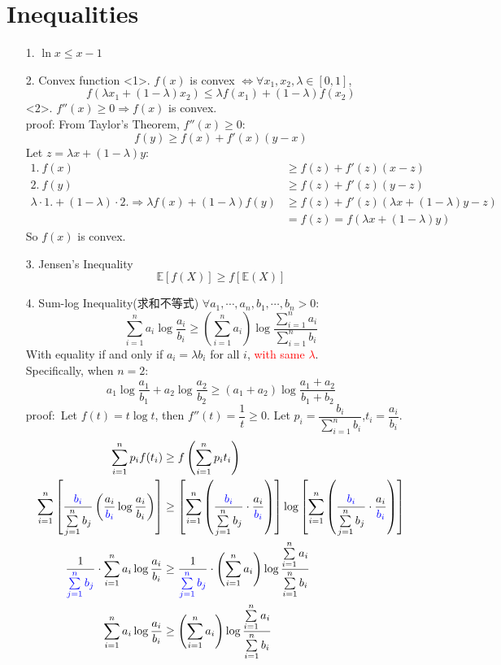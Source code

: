 
\section{Inequalities}
\begin{itemize}
\item[1.] $\ln x\leq x-1$
\item[2.] Convex function
<1>. $f(x)$ is convex $\Leftrightarrow \forall x_1,x_2,\lambda\in[0,1]$, $$f\left(\lambda x_1+(1-\lambda)x_2\right)\leq\lambda f(x_1)+(1-\lambda)f(x_2)$$
<2>. $f''(x)\geq 0\Rightarrow f(x)$ is convex.\\
proof: From Taylor's Theorem, $f''(x)\geq 0$:
$$f(y) \geq f(x) + f'(x)(y-x)$$
Let $z = \lambda x + (1-\lambda)y$:
\begin{align*}
1.\ f(x) &\geq f(z) + f'(z)(x-z) \\
2.\ f(y) &\geq f(z) + f'(z)(y-z) \\
\lambda\cdot 1. + (1-\lambda)\cdot 2. \Rightarrow \lambda f(x) + (1-\lambda)f(y) &\geq f(z) + f'(z)(\lambda x + (1-\lambda)y - z) \\
&= f(z) = f(\lambda x + (1-\lambda)y)
\end{align*}
So $f(x)$ is convex.

\item[3.] Jensen's Inequality
$$\mathbb{E}\left[f(X)\right]\geq f\left[\mathbb{E}(X)\right]$$

\item[4.] Sum-log Inequality(求和不等式)
$\forall a_1,\cdots,a_n,b_1,\cdots,b_n>0$:
$$\sum_{i=1}^{n}a_i\log\dfrac{a_i}{b_i}\geq \left(\sum_{i=1}^{n}a_i\right)\log\dfrac{\sum\limits_{i=1}^{n}a_i}{\sum\limits_{i=1}^{n}b_i}$$
With equality if and only if $a_i=\lambda b_i$ for all $i$, \textcolor{red}{with same $\lambda$}.\\
Specifically, when $n=2$:
$$a_1\log\dfrac{a_1}{b_1}+a_2\log\dfrac{a_2}{b_2}\geq (a_1+a_2)\log\dfrac{a_1+a_2}{b_1+b_2}$$
proof:\ Let $f(t)=t\log t$, then $f''(t)=\dfrac{1}{t}\geq 0$.
Let $p_i=\dfrac{b_i}{\sum\limits_{i=1}^{n}b_i}$,$t_i=\dfrac{a_i}{b_i}$.
\begin{align*}
\sum_{i=1}^np_if(t_i) &\geq f\left(\sum_{i=1}^np_it_i\right) \\
\sum_{i=1}^n\left[\dfrac{\textcolor{blue}{b_i}}{\sum\limits_{j=1}^{n}b_j}\left(\dfrac{a_i}{\textcolor{blue}{b_i}}\log\dfrac{a_i}{b_i}\right)\right] &\geq \left[\sum_{i=1}^n\left(\dfrac{\textcolor{blue}{b_i}}{\sum\limits_{j=1}^{n}b_j}\cdot\dfrac{a_i}{\textcolor{blue}{b_i}}\right)\right]\log\left[\sum_{i=1}^n\left(\dfrac{\textcolor{blue}{b_i}}{\sum\limits_{j=1}^{n}b_j}\cdot\dfrac{a_i}{\textcolor{blue}{b_i}}\right)\right] \\
\dfrac{1}{\textcolor{blue}{\sum\limits_{j=1}^{n}b_j}}\cdot \sum_{i=1}^na_i\log\dfrac{a_i}{b_i} &\geq \dfrac{1}{\textcolor{blue}{\sum\limits_{j=1}^{n}b_j}}\cdot \left(\sum_{i=1}^{n}a_i\right)\log\dfrac{\sum\limits_{i=1}^{n}a_i}{\sum\limits_{i=1}^{n}b_i} \\
\sum_{i=1}^na_i\log\dfrac{a_i}{b_i} &\geq \left(\sum_{i=1}^{n}a_i\right)\log\dfrac{\sum\limits_{i=1}^{n}a_i}{\sum\limits_{i=1}^{n}b_i} \\
\end{align*}
\end{itemize}


